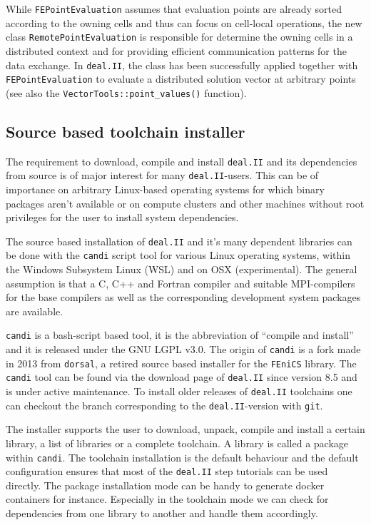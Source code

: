 \documentclass{ansarticle-preprint}
\newcommand{\specialword}[1]{\texttt{#1}}
\newcommand{\dealii}{{\specialword{deal.II}}\xspace}
\newcommand{\candi}{{\specialword{candi}}\xspace}
\begin{document}
While \texttt{FEPointEvaluation} assumes that evaluation points are already sorted according to 
the owning cells and thus can focus on cell-local operations, the new class
\texttt{RemotePointEvaluation} is responsible for determine the owning cells in a distributed
context and for providing efficient communication patterns for the data exchange. In \texttt{deal.II},
the class has been successfully applied together with \texttt{FEPointEvaluation} to evaluate a distributed
solution vector at arbitrary points (see also the
\texttt{VectorTools::point\_values()} function).


\subsection{Source based toolchain installer}
\label{subsec:candi}

The requirement to download, compile and install \dealii{} and its dependencies from
source is of major interest for many \dealii{}-users.
%
This can be of importance on arbitrary Linux-based operating systems for which
binary packages aren't available or on compute clusters and other machines
without root privileges for the user to install system dependencies.

The source based installation of \dealii{} and it's many dependent libraries
can be done with the \candi{} script tool for various
Linux operating systems, within the Windows Subsystem Linux (WSL) and on OSX (experimental).
%
The general assumption is that a C, C++ and Fortran compiler and suitable MPI-compilers
for the base compilers as well as the corresponding development system packages are
available.

\candi is a bash-script based tool, it is the abbreviation of ``compile and install''
and it is released under the GNU LGPL v3.0.
%
The origin of \candi{} is a fork made in 2013 from \texttt{dorsal},
a retired source based installer for the \texttt{FEniCS} library.
%
The \candi{} tool can be found via the download page of \dealii{} since version 8.5
and is under active maintenance.
To install older releases of \dealii{} toolchains one can checkout the branch
corresponding to the \dealii{}-version with \texttt{git}.

The installer supports the user to download, unpack, compile and install a certain
library, a list of libraries or a complete toolchain.
A library is called a package within \candi{}.
The toolchain installation is the default behaviour and the default configuration
ensures that most of the \dealii{} step tutorials can be used directly.
The package installation mode can be handy to generate docker containers
for instance.
Especially in the toolchain mode we can check for dependencies from one library to
another and handle them accordingly.
\end{document}
